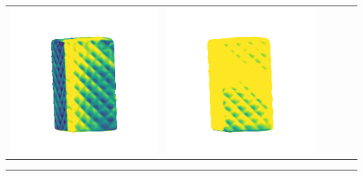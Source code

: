 \begin{center}
\begin{tabularx}{\linewidth}{@{}Y@{}Y@{}Y@{}Y@{}Y@{}Y@{}}
\includegraphics[width=\linewidth]{semisynthetic/20150514_18_marrnet_err.png} &
\includegraphics[width=\linewidth]{semisynthetic/20150514_18_ef_err.png} \\
\end{tabularx}
\begin{center}\rule{0.5\linewidth}{\linethickness}\end{center}


\end{center}
